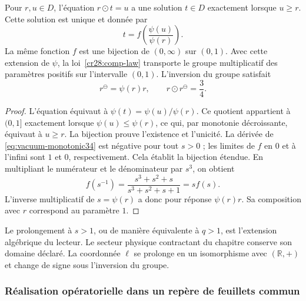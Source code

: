 \begin{proposition}
\label{cr28:comp-inverse}
Pour $r,u\in D$, l’équation $r\odot t=u$ a une solution $t\in D$
exactement lorsque $u\geq r$. Cette solution est unique et donnée par
\begin{equation}
 t=f\!\left(\frac{\psi(u)}{\psi(r)}\right).
 \label{cr28:comp-cancellation}
\end{equation}
La même fonction $f$ est une bijection de $(0,\infty)$ sur $(0,1)$.
Avec cette extension de $\psi$, la loi~\eqref{cr28:comp-law} transporte le
groupe multiplicatif des paramètres positifs sur l’intervalle $(0,1)$.
L’inversion du groupe satisfait
\begin{equation}
 r^{\ominus}=\psi(r)r,\qquad
 r\odot r^{\ominus}=\frac34.
 \label{cr28:comp-group-inverse}
\end{equation}
\end{proposition}
\begin{proof}
L’équation équivaut à
$\psi(t)=\psi(u)/\psi(r)$. Ce quotient appartient à $(0,1]$
exactement lorsque $\psi(u)\leq\psi(r)$, ce qui, par monotonie décroissante,
équivaut à $u\geq r$. La bijection prouve l’existence et l’unicité.
La dérivée de \eqref{eq:vacuum-monotonic34} est négative pour tout $s>0$ ;
les limites de $f$ en $0$ et à l’infini sont $1$ et $0$, respectivement.
Cela établit la bijection étendue. En multipliant le numérateur et le
dénominateur par $s^3$, on obtient
\[
 f(s^{-1})=\frac{s^3+s^2+s}{s^3+s^2+s+1}=s f(s).
\]
L’inverse multiplicatif de $s=\psi(r)$ a donc pour réponse
$\psi(r)r$. Sa composition avec $r$ correspond au paramètre $1$.
\end{proof}

Le prolongement à $s>1$, ou de manière équivalente à $q>1$, est l’extension
algébrique du lecteur. Le secteur physique contractant du chapitre conserve
son domaine déclaré. La coordonnée $\ell$ se prolonge en un isomorphisme
avec $(\mathbb R,+)$ et change de signe sous l’inversion du groupe.

\subsubsection{Réalisation opératorielle dans un repère de feuillets commun}

